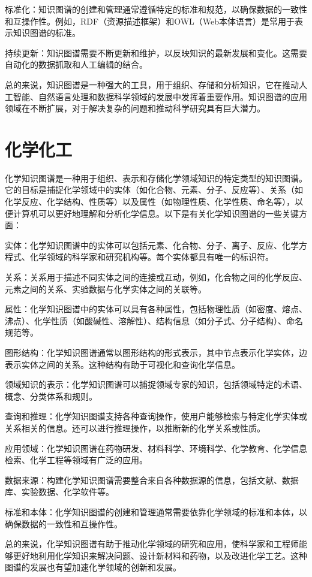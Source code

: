 标准化：知识图谱的创建和管理通常遵循特定的标准和规范，以确保数据的一致性和互操作性。例如，RDF（资源描述框架）和OWL（Web本体语言）是常用于表示知识图谱的标准。

持续更新：知识图谱需要不断更新和维护，以反映知识的最新发展和变化。这需要自动化的数据抓取和人工编辑的结合。

总的来说，知识图谱是一种强大的工具，用于组织、存储和分析知识，它在推动人工智能、自然语言处理和数据科学领域的发展中发挥着重要作用。知识图谱的应用领域在不断扩展，对于解决复杂的问题和推动科学研究具有巨大潜力。

\section{化学化工}
化学知识图谱是一种用于组织、表示和存储化学领域知识的特定类型的知识图谱。它的目标是捕捉化学领域中的实体（如化合物、元素、分子、反应等）、关系（如化学反应、化学结构、性质等）以及属性（如物理性质、化学性质、命名等），以便计算机可以更好地理解和分析化学信息。以下是有关化学知识图谱的一些关键方面：

实体：化学知识图谱中的实体可以包括元素、化合物、分子、离子、反应、化学方程式、化学领域的科学家和研究机构等。每个实体都具有唯一的标识符。

关系：关系用于描述不同实体之间的连接或互动，例如，化合物之间的化学反应、元素之间的关系、实验数据与化学实体之间的关联等。

属性：化学知识图谱中的实体可以具有各种属性，包括物理性质（如密度、熔点、沸点）、化学性质（如酸碱性、溶解性）、结构信息（如分子式、分子结构）、命名规范等。

图形结构：化学知识图谱通常以图形结构的形式表示，其中节点表示化学实体，边表示实体之间的关系。这种结构有助于可视化和查询化学信息。

领域知识的表示：化学知识图谱可以捕捉领域专家的知识，包括领域特定的术语、概念、分类体系和规则。

查询和推理：化学知识图谱支持各种查询操作，使用户能够检索与特定化学实体或关系相关的信息。还可以进行推理操作，以推断新的化学关系或性质。

应用领域：化学知识图谱在药物研发、材料科学、环境科学、化学教育、化学信息检索、化学工程等领域有广泛的应用。

数据来源：构建化学知识图谱需要整合来自各种数据源的信息，包括文献、数据库、实验数据、化学软件等。

标准和本体：化学知识图谱的创建和管理通常需要依靠化学领域的标准和本体，以确保数据的一致性和互操作性。

总的来说，化学知识图谱有助于推动化学领域的研究和应用，使科学家和工程师能够更好地利用化学知识来解决问题、设计新材料和药物，以及改进化学工艺。这种图谱的发展也有望加速化学领域的创新和发展。


